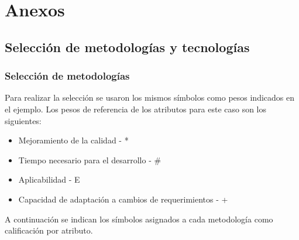 \documentclass[twoside]{article}
\begin{document}
\section{Anexos}
\subsection{Selección de metodologías y tecnologías}
\subsubsection{Selección de metodologías}
Para realizar la selección se usaron los mismos símbolos como pesos indicados en el ejemplo. Los pesos de referencia de los atributos para este caso son los siguientes:
\begin{itemize}
    \item Mejoramiento de la calidad - *
    \item Tiempo necesario para el desarrollo - \#
    \item Aplicabilidad - E
    \item Capacidad de adaptación a cambios de requerimientos - +
\end{itemize}
A continuación se indican los símbolos asignados a cada metodología como calificación por atributo.
\end{document}
